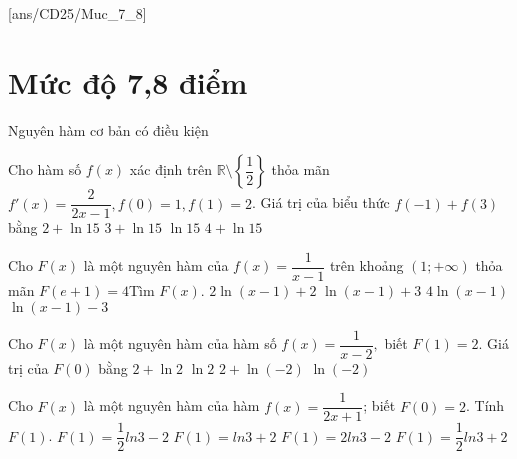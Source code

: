[ans/CD25/Muc_7_8]
\setcounter{ex}{0}
\setcounter{dang}{0}
\section{Mức độ 7,8 điểm}
\begin{dang}
	{Nguyên hàm cơ bản có điều kiện}
\end{dang}      
\begin{ex}
	Cho hàm số $ f(x)$ xác định trên $\mathbb{R}\setminus\left\{\dfrac{1}{2}\right\}$ thỏa mãn $f'(x)=\dfrac{2}{2x-1},f(0)=1,f(1)=2$. Giá trị của biểu thức $ f\left(-1\right)+f(3)$ bằng
	\choice
	{$ 2+\ln 15$}
	{$ 3+\ln 15$}
	{\True $\ln 15$}
	{$ 4+\ln 15$}
\end{ex}
\begin{ex}
	Cho $ F(x)$ là một nguyên hàm của $ f(x)=\dfrac{1}{x-1}$ trên khoảng $\left(1;+\infty\right)$ thỏa mãn $ F\left(e+1\right)=4$Tìm $ F(x)$.
	\choice
	{$ 2\ln\left(x-1\right)+2$}
	{\True $\ln\left(x-1\right)+3$}
	{$ 4\ln\left(x-1\right)$}
	{$\ln\left(x-1\right)-3$}
\end{ex}
\begin{ex}
	Cho $F(x)$ là một nguyên hàm của hàm số $f(x)=\dfrac{1}{x-2},$ biết $F(1)=2.$ Giá trị của $F(0)$ bằng
	\choice
	{\True $ 2+\ln 2$}
	{$\ln 2$}
	{$ 2+\ln\left(-2\right)$}
	{$\ln\left(-2\right)$}
\end{ex}
\begin{ex}
	Cho $F(x)$ là một nguyên hàm của hàm $f(x)=\dfrac{1}{2x+1}$; biết $F(0)=2$. Tính $F(1)$.
	\choice
	{$F(1)=\dfrac{1}{2}ln3-2$}
	{$F(1)=ln3+2$}
	{$F(1)=2ln3-2$}
	{\True $F(1)=\dfrac{1}{2}ln3+2$}
\end{ex}

